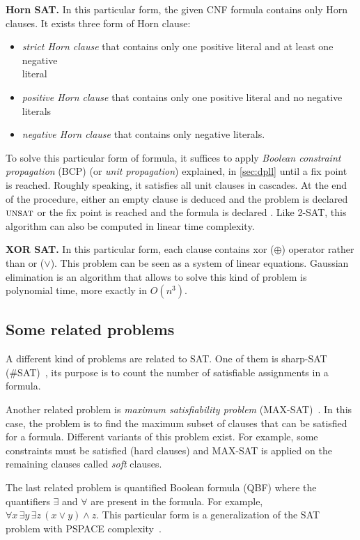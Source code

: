 \textbf{Horn SAT.}\cite{dowling1984linear} In this particular form, the given CNF formula contains only Horn clauses. It exists three form
of Horn clause: 
\begin{itemize}[topsep=0pt,itemsep=1pt]
\item \emph{strict Horn clause} that contains only one positive literal and at least one negative \\literal
\item \emph{positive Horn clause} that contains only one positive literal and no negative literals
\item \emph{negative Horn clause} that contains only negative literals.
\end{itemize}

To solve this particular form of formula, it suffices to  apply \emph{Boolean constraint propagation} (BCP) (or \emph{unit propagation}) explained, in \cref{sec:dpll} until a fix point
is reached.
Roughly speaking, it satisfies all unit clauses in cascades. At the end of the procedure, either an empty clause is deduced and the problem
is declared $\textsc{unsat}$ or the fix point is reached and the formula is declared \sat.
 Like 2-SAT, this algorithm can also be computed in linear time complexity.

\textbf{XOR SAT.}\cite{moore2011nature} In this particular form, each clause contains xor ($\oplus$) operator rather than or ($\lor$).
This problem can be seen as a system of linear equations. Gaussian elimination is an algorithm that allows to solve this kind of
problem is polynomial time, more exactly in $O(n^3)$.


\subsection{Some related problems}

A different kind of problems are related to SAT.%
One of them is sharp-SAT (\#SAT)~\cite{valiant1979complexity}, its purpose is to count the number of satisfiable assignments in a formula.

Another related problem is \textit{maximum satisfiability problem} (MAX-SAT)~\cite{biere2009handbook}. In this case, the problem
is to find the maximum subset of clauses that can be satisfied for a formula. Different variants
of this problem exist. For example, some constraints must be satisfied (hard clauses) and MAX-SAT
is applied on the remaining clauses called \emph{soft} clauses.

The last related problem is quantified Boolean formula (QBF) where the quantifiers $\exists$ and
$\forall$ are present in the formula. For example, $\forall x\, \exists y\, \exists z \, (x \lor y) \land z$.
This particular form is a generalization of the SAT problem with PSPACE complexity~\cite{garey2002computers}.
